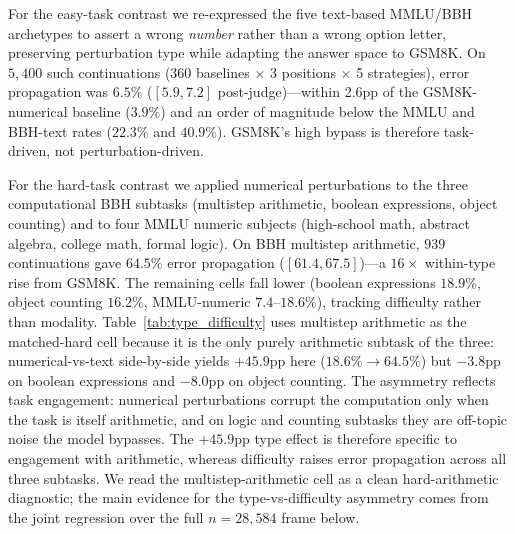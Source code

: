 \documentclass[10pt]{article} %
\begin{document}
For the easy-task contrast we re-expressed the five text-based MMLU/BBH archetypes to assert a wrong \emph{number} rather than a wrong option letter, preserving perturbation type while adapting the answer space to GSM8K. On $5{,}400$ such continuations (360 baselines $\times$ 3 positions $\times$ 5 strategies), error propagation was $6.5\%$ ($[5.9, 7.2]$ post-judge)---within 2.6pp of the GSM8K-numerical baseline ($3.9\%$) and an order of magnitude below the MMLU and BBH-text rates ($22.3\%$ and $40.9\%$). GSM8K's high bypass is therefore task-driven, not perturbation-driven.

For the hard-task contrast we applied numerical perturbations to the three computational BBH subtasks (multistep arithmetic, boolean expressions, object counting) and to four MMLU numeric subjects (high-school math, abstract algebra, college math, formal logic). On BBH multistep arithmetic, $939$ continuations gave $64.5\%$ error propagation ($[61.4, 67.5]$)---a $16\times$ within-type rise from GSM8K. The remaining cells fall lower (boolean expressions $18.9\%$, object counting $16.2\%$, MMLU-numeric $7.4$--$18.6\%$), tracking difficulty rather than modality. Table~\ref{tab:type_difficulty} uses multistep arithmetic as the matched-hard cell because it is the only purely arithmetic subtask of the three: numerical-vs-text side-by-side yields $+45.9$pp here ($18.6\% \to 64.5\%$) but $-3.8$pp on boolean expressions and $-8.0$pp on object counting. The asymmetry reflects task engagement: numerical perturbations corrupt the computation only when the task is itself arithmetic, and on logic and counting subtasks they are off-topic noise the model bypasses. The $+45.9$pp type effect is therefore specific to engagement with arithmetic, whereas difficulty raises error propagation across all three subtasks. We read the multistep-arithmetic cell as a clean hard-arithmetic diagnostic; the main evidence for the type-vs-difficulty asymmetry comes from the joint regression over the full $n = 28{,}584$ frame below.
\end{document}
